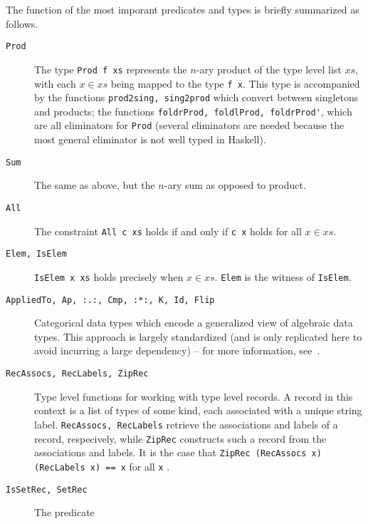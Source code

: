         The function of the most imporant 
        predicates and types is briefly summarized as follows. 
        \begin{description}
            \item[\texttt{Prod}] The type \lstinline{Prod f xs} 
            represents the $n$-ary product of the type
            level list $xs$, with each $x \in xs$ being mapped 
            to the type \lstinline{f x}. This 
            type is accompanied by the functions 
            \lstinline{prod2sing, sing2prod} which convert
            between singletons and products; the functions 
            \lstinline{foldrProd, foldlProd, foldrProd'}, 
            which are all eliminators for \lstinline{Prod} 
            (several eliminators are needed because the 
            most general eliminator is not well typed in 
            Haskell). 
            \item[\texttt{Sum}] The same as above, but the 
            $n$-ary sum as opposed to product. 
            \item[\texttt{All}] The constraint 
            \lstinline{All c xs} holds if and only if 
            \lstinline{c x} holds for 
            all $x \in xs$. 
            \item[\texttt{Elem, IsElem}]
            \lstinline{IsElem x xs} holds precisely when $x \in 
            xs$. 
            \lstinline{Elem} is the witness of 
            \lstinline{IsElem}. 
            \item[\texttt{AppliedTo, Ap, :.:, Cmp, :*:, K, Id, 
            Flip}] Categorical data types which encode
            a generalized view of algebraic data types. This 
            approach is largely standardized (and is only
            replicated here to avoid incurring a large 
            dependency) -- for more information, 
            see~\cite{alacarte}. 
            \item[\texttt{RecAssocs, RecLabels, ZipRec}] Type 
            level functions for working with type level 
            records. 
            A record in this context is a list of types of some 
            kind, each associated with a unique string label. 
            \lstinline{RecAssocs, RecLabels} retrieve the 
            associations and labels of a record, respecively, 
            while \lstinline{ZipRec} constructs such a record 
            from the associations and labels. It is the case
            that 
            \lstinline{ZipRec (RecAssocs x) (RecLabels x) == x} for all 
            \lstinline{x} .
            \item[\texttt{IsSetRec, SetRec}] The predicate 

\end{description}
